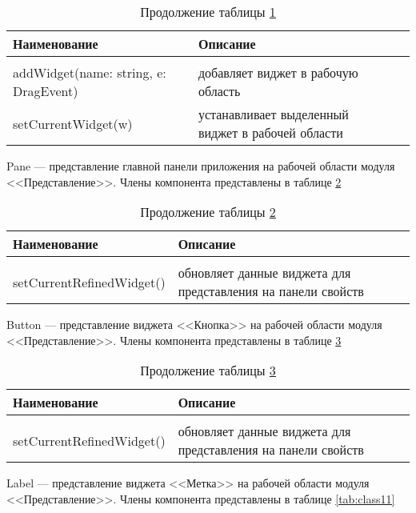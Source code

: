 \begin{longtable} {| p{8.3cm} | p{8.35cm}l |}
	\caption{Члены компонента ViewWorkspace}
	\label{tab:class8}\\
	\hline
	\centering Наименование &  \centering Описание & \\
	\hline
	\endfirsthead
	\caption*{Продолжение таблицы \ref{tab:class8}}\\
	\hline
	\endhead
	\hline
	\endfoot
	addWidget(name: string, e: DragEvent) & добавляет виджет в рабочую область & \\
	\hline
	setCurrentWidget(w) & устанавливает выделенный виджет в рабочей области & \\
\end{longtable}

Pane --- представление главной панели приложения на рабочей области модуля <<Представление>>. Члены компонента представлены в таблице \ref{tab:class9}

\begin{longtable} {| p{8.3cm} | p{8.35cm}l |}
	\caption{Члены компонента Pane}
	\label{tab:class9}\\
	\hline
	\centering Наименование &  \centering Описание & \\
	\hline
	\endfirsthead
	\caption*{Продолжение таблицы \ref{tab:class9}}\\
	\hline
	\endhead
	\hline
	\endfoot
	setCurrentRefinedWidget() & обновляет данные виджета для представления на панели свойств & \\
\end{longtable}

Button --- представление виджета <<Кнопка>> на рабочей области модуля <<Представление>>. Члены компонента представлены в таблице \ref{tab:class10}

\begin{longtable} {| p{8.3cm} | p{8.35cm}l |}
	\caption{Члены компонента Button}
	\label{tab:class10}\\
	\hline
	\centering Наименование &  \centering Описание & \\
	\hline
	\endfirsthead
	\caption*{Продолжение таблицы \ref{tab:class10}}\\
	\hline
	\endhead
	\hline
	\endfoot
	setCurrentRefinedWidget() & обновляет данные виджета для представления на панели свойств & \\
\end{longtable}

Label --- представление виджета <<Метка>> на рабочей области модуля <<Представление>>. Члены компонента представлены в таблице \ref{tab:class11}


